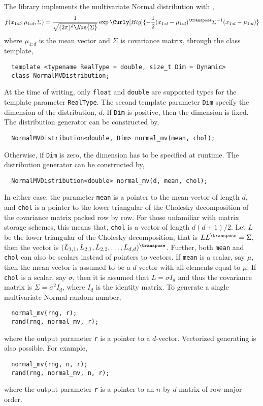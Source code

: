 The library implements the multivariate Normal distribution with \pdf,
\begin{equation*}
  f(x_{1:d};\mu_{1:d},\Sigma) = \frac{1}{\sqrt{(2\pi)^d\Abs{\Sigma}}}
  \exp\Curly[Big]{-\frac{1}{2}
    (x_{1:d} - \mu_{1:d})^{\transpose}\Sigma^{-1}(x_{1:d} - \mu_{1:d})}
\end{equation*}
where $\mu_{1:d}$ is the mean vector and $\Sigma$ is covariance matrix, through
the class template,
\begin{Verbatim}
  template <typename RealType = double, size_t Dim = Dynamic>
  class NormalMVDistribution;
\end{Verbatim}
At the time of writing, only \verb|float| and \verb|double| are supported types
for the template parameter \verb|RealType|. The second template parameter
\verb|Dim| specify the dimension of the distribution, $d$. If \verb|Dim| is
positive, then the dimension is fixed. The distribution generator can be
constructed by,
\begin{Verbatim}
  NormalMVDistribution<double, Dim> normal_mv(mean, chol);
\end{Verbatim}
Otherwise, if \verb|Dim| is zero, the dimension has to be specified at runtime.
The distribution generator can be constructed by,
\begin{Verbatim}
  NormalMVDistribution<double> normal_mv(d, mean, chol);
\end{Verbatim}
In either case, the parameter \verb|mean| is a pointer to the mean vector of
length $d$, and \verb|chol| is a pointer to the lower triangular of the
Cholesky decomposition of the covariance matrix packed row by row. For those
unfamiliar with matrix storage schemes, this means that, \verb|chol| is a
vector of length $d(d+1)/2$. Let $L$ be the lower triangular of the Cholesky
decomposition, that is $LL^{\transpose} = \Sigma$, then the vector is
$(L_{1,1},L_{2,1},L_{2,2},\dots,L_{d,d})^{\transpose}$. Further, both
\verb|mean| and \verb|chol| can also be scalars instead of pointers to vectors.
If \verb|mean| is a scalar, say $\mu$, then the mean vector is assumed to be a
$d$-vector with all elements equal to $\mu$. If \verb|chol| is a scalar, say
$\sigma$, then it is assumed that $L = \sigma I_d$ and thus the covariance
matrix is $\Sigma = \sigma^2 I_d$, where $I_d$ is the identity matrix. To
generate a single multivariate Normal random number,
\begin{Verbatim}
  normal_mv(rng, r);
  rand(rng, normal_mv, r);
\end{Verbatim}
where the output parameter \verb|r| is a pointer to a $d$-vector. Vectorized
generating is also possible. For example,
\begin{Verbatim}
  normal_mv(rng, n, r);
  rand(rng, normal_mv, n, r);
\end{Verbatim}
where the output parameter \verb|r| is a pointer to an $n$ by $d$ matrix of row
major order.
